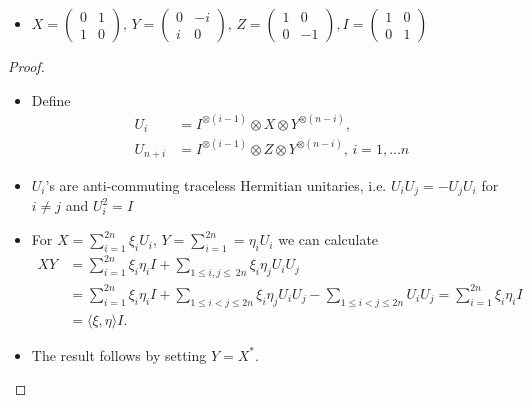 \begin{frame}
	\begin{itemize}
		\item<1->{\footnotesize $
		X = \begin{pmatrix}
		0 & 1 \\ 1 & 0
		\end{pmatrix}, \, Y = \begin{pmatrix}
		0 & -i \\ i & 0
		\end{pmatrix}, \, Z = \begin{pmatrix}
		1 & 0 \\ 0 & -1
		\end{pmatrix}, I = \begin{pmatrix}
		1 & 0 \\ 0 & 1
		\end{pmatrix} $}
	\end{itemize}
		\begin{proof}
			\begin{itemize}
				\item Define 
				\begin{align*}
					U_i &= I^{\otimes (i-1)} \otimes X \otimes Y^{\otimes (n-i)},   \\
					U_{n+i} &= I^{\otimes (i-1)} \otimes Z \otimes Y^{\otimes (n-i)}, \, i=1,\hdots n 
				\end{align*}
				\item $ U_i $'s are anti-commuting traceless Hermitian unitaries, i.e.
				$ U_iU_j = -U_jU_i $ for $ i \neq j $ and $ U_i^2 = I $ 
				\item For $ X = \sum_{i = 1}^{2n}\xi_i U_i$, $ Y = \sum_{i = 1}^{2n} = \eta_iU_i $ we can calculate 
				\begin{align*}
				XY &= \sum_{i = 1}^{2n} \xi_i \eta_i I + \sum_{1 \le i,j \le \ 2n}\xi_i\eta_j U_i U_j   \\
				&= \sum_{i = 1}^{2n} \xi_i \eta_i I + \sum_{1 \le i < j \le  2n}\xi_i\eta_jU_iU_j - \sum_{1 \le i < j \le  2n}U_iU_j =\sum_{i = 1}^{2n} \xi_i \eta_i I \\
				&= \langle \xi, \eta \rangle I.
				\end{align*}
				\item The result follows by setting $ Y = X^{*} $.
			\end{itemize}
		\end{proof}
\end{frame}


